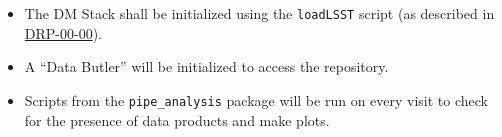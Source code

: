 \begin{itemize}

  \item{The DM Stack shall be initialized using the \texttt{loadLSST} script
  (as described in \hyperref[drp-00-00]{DRP-00-00}).}

  \item{A ``Data Butler'' will be initialized to access the repository.}

  \item{Scripts from the \texttt{pipe\_analysis} package will be run on every visit to check for the presence of data products and make plots.}

\end{itemize}
